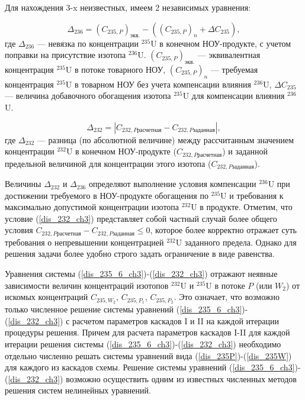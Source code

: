 Для нахождения 3-x неизвестных, имеем 2 независимых уравнения:  

\begin{equation}
    \label{dis_235_6_ch3}
    \Delta_{236}=(C_{235,P})_{\textit{экв.}}-((C_{235,P})_n+\Delta C_{235}),
\end{equation}
где $\Delta_{236}$ --- невязка по концентрации $^{235}$U в конечном НОУ-продукте, с учетом поправки на присутствие изотопа $^{236}$U. $(C_{235,P})_{\textit{экв.}}$ --- эквивалентная концентрация $^{235}$U в потоке товарного НОУ, $(C_{235,P})_n$ --- требуемая концентрация $^{235}$U в товарном НОУ без учета компенсации влияния $^{236}$U, $\Delta C_{235}$ --- величина добавочного обогащения изотопа $^{235}$U для компенсации влияния $^{236}$U. 

\begin{equation}
\label{dis_232_ch3}
\Delta_{232}=\left|C_{232,P\textit{расчетная}}-C_{232,P\textit{заданная}}\right|,
\end{equation}
где $\Delta_{232}$ --- разница (по абсолютной величине) между рассчитанным значением концентрации $^{232}$U в конечном НОУ-продукте ($C_{232,P\textit{расчетная}}$) и заданной предельной величиной для концентрации этого изотопа ($C_{232,P\textit{заданная}}$).

Величины $\Delta_{232}$ и $\Delta_{236}$ определяют выполнение условия компенсации $^{236}$U при достижении требуемого в НОУ-продукте обогащения по $^{235}$U и требования к максимально допустимой концентрации изотопа $^{232}$U в продукте. Отметим, что условие (\ref{dis_232_ch3}) представляет собой частный случай более общего условия $C_{232,P\textit{расчетная}}-C_{232,P\textit{заданная}}\leq 0$, которое более корректно отражает суть требования о непревышении концентрацией $^{232}$U заданного предела. Однако для решения задачи более удобно строго задать ограничение в виде равенства. 

Уравнения системы (\ref{dis_235_6_ch3})-(\ref{dis_232_ch3}) отражают неявные зависимости величин концентраций изотопов $^{232}$U и $^{235}$U в потоке $P$ (или $W_2$) от искомых концентраций $C_{235,{W_2}}$, $C_{235,{P_1}}$, $C_{235,{P_2}}$. Это означает, что возможно только численное решение системы уравнений (\ref{dis_235_6_ch3})-(\ref{dis_232_ch3}) с расчетом параметров каскадов I и II на каждой итерации процедуры решения. Причем для расчета параметров каскадов I-II для каждой итерации решения системы (\ref{dis_235_6_ch3})-(\ref{dis_232_ch3}) необходимо отдельно численно решать системы уравнений вида (\ref{dis_235P})-(\ref{dis_235W}) для каждого из каскадов схемы. Решение системы уравнений (\ref{dis_235_6_ch3})-(\ref{dis_232_ch3}) возможно осуществить одним из известных численных методов решения систем нелинейных уравнений. 

